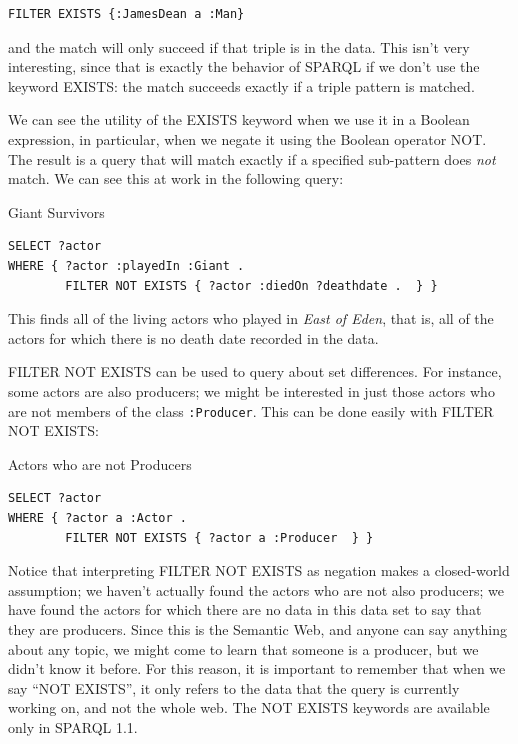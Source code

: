 \begin{lstlisting}
FILTER EXISTS {:JamesDean a :Man} 
\end{lstlisting}

and the match will only succeed if that triple is
in the data. This isn't very interesting, since that is exactly the
behavior of SPARQL if we don't use the keyword EXISTS: the match
succeeds exactly if a triple pattern is matched.

We can see the utility of the EXISTS keyword when we use it in a Boolean
expression, in particular, when we negate it using the Boolean operator
NOT. The result is a query that will match exactly if a specified
sub-pattern does \emph{not} match. We can see this at work in the
following query:

\begin{query}Giant Survivors\end{query}
\begin{lstlisting}
SELECT ?actor
WHERE { ?actor :playedIn :Giant .
        FILTER NOT EXISTS { ?actor :diedOn ?deathdate .  } }
\end{lstlisting}

This finds all of the living actors who played in \emph{East of Eden},
that is, all of the actors for which there is no death date recorded in
the data.

FILTER NOT EXISTS can be used to query about set differences. For
instance, some actors are also producers; we might be interested in just
those actors who are not members of the class \texttt{:Producer}. This can be
done easily with FILTER NOT EXISTS:

\begin{query}Actors who are not Producers\end{query}
\begin{lstlisting}
SELECT ?actor
WHERE { ?actor a :Actor .
        FILTER NOT EXISTS { ?actor a :Producer  } }
\end{lstlisting}

Notice that interpreting FILTER NOT EXISTS as negation makes a
closed-world assumption; we haven't actually found the actors who are
not also producers; we have found the actors for which there are no data
in this data set to say that they are producers. Since this is the
Semantic Web, and anyone can say anything about any topic, we might come
to learn that someone is a producer, but we didn't know it before. For
this reason, it is important to remember that when we say ``NOT
EXISTS'', it only refers to the data that the query is currently working
on, and not the whole web. The NOT EXISTS keywords are available only in
SPARQL 1.1.

